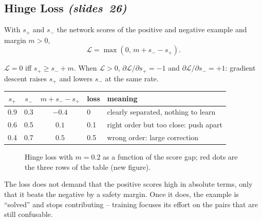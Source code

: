 \documentclass[11pt,a4paper]{article}
\newcommand{\slr}[1]{\texorpdfstring{\emph{(slides~#1)}}{(slides #1)}}
\theoremstyle{definition}
\begin{document}
\subsection{Hinge Loss \slr{26}}
\begin{Definition}
With $s_+$ and $s_-$ the network scores of the positive and negative example and margin $m>0$,
\[ \mathcal L=\max(0,\,m+s_--s_+). \]
\end{Definition}
\begin{Lemma}
$\mathcal L=0$ iff $s_+\ge s_-+m$. When $\mathcal L>0$, $\partial\mathcal L/\partial s_+=-1$ and $\partial\mathcal L/\partial s_-=+1$: gradient descent raises $s_+$ and lowers $s_-$ at the same rate.
\end{Lemma}
\begin{Example}[$m=0.2$, the value used in the paper]
\begin{center}\small
\begin{tabular}{@{}cccll@{}}\toprule
$s_+$ & $s_-$ & $m+s_--s_+$ & loss & meaning\\\midrule
0.9 & 0.3 & $-0.4$ & 0 & clearly separated, nothing to learn\\
0.6 & 0.5 & $0.1$ & 0.1 & right order but too close: push apart\\
0.4 & 0.7 & $0.5$ & 0.5 & wrong order: large correction\\\bottomrule
\end{tabular}
\end{center}
\end{Example}
\begin{figure}[H]\centering
{}
\caption{Hinge loss with $m=0.2$ as a function of the score gap; red dots are the three rows of the table (new figure).}
\end{figure}
\begin{intuition}
The loss does not demand that the positive scores high in absolute terms, only that it beats the negative by a safety margin. Once it does, the example is ``solved'' and stops contributing -- training focuses its effort on the pairs that are still confusable.
\end{intuition}
\end{document}
